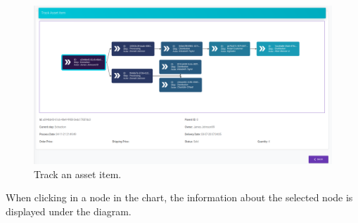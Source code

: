 %

\begin{figure}[H]
\begin{center}
  \includegraphics[scale=0.275]{images/use_example/092_track_asset_Item.png}
\caption{Track an asset item.}
\label{fig:track_asset_item}
\end{center}
\end{figure}

When clicking in a node in the chart, the information about the selected node is displayed under the diagram.